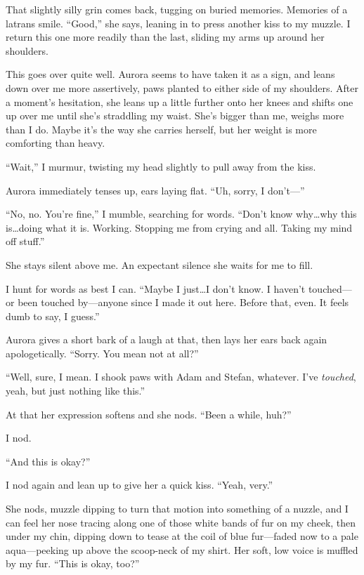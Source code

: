 That slightly silly grin comes back, tugging on buried memories. Memories of a latrans smile. ``Good,'' she says, leaning in to press another kiss to my muzzle. I return this one more readily than the last, sliding my arms up around her shoulders.

This goes over quite well. Aurora seems to have taken it as a sign, and leans down over me more assertively, paws planted to either side of my shoulders. After a moment's hesitation, she leans up a little further onto her knees and shifts one up over me until she's straddling my waist. She's bigger than me, weighs more than I do. Maybe it's the way she carries herself, but her weight is more comforting than heavy.

``Wait,'' I murmur, twisting my head slightly to pull away from the kiss.

Aurora immediately tenses up, ears laying flat. ``Uh, sorry, I don't---''

``No, no. You're fine,'' I mumble, searching for words. ``Don't know why\ldots{}why this is\ldots{}doing what it is. Working. Stopping me from crying and all. Taking my mind off stuff.''

She stays silent above me. An expectant silence she waits for me to fill.

I hunt for words as best I can. ``Maybe I just\ldots{}I don't know. I haven't touched---or been touched by---anyone since I made it out here. Before that, even. It feels dumb to say, I guess.''

Aurora gives a short bark of a laugh at that, then lays her ears back again apologetically. ``Sorry. You mean not at all?''

``Well, sure, I mean. I shook paws with Adam and Stefan, whatever. I've \emph{touched}, yeah, but just nothing like this.''

At that her expression softens and she nods. ``Been a while, huh?''

I nod.

``And this is okay?''

I nod again and lean up to give her a quick kiss. ``Yeah, very.''

She nods, muzzle dipping to turn that motion into something of a nuzzle, and I can feel her nose tracing along one of those white bands of fur on my cheek, then under my chin, dipping down to tease at the coil of blue fur---faded now to a pale aqua---peeking up above the scoop-neck of my shirt. Her soft, low voice is muffled by my fur. ``This is okay, too?''

